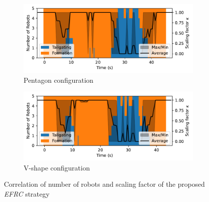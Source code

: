 \begin{figure}[!h]
\begin{subfigure}[b]{0.49\textwidth}
    
    \centering
    \includegraphics[width=\linewidth]{paper2/images/mode_edc_shape1.pdf}
    \caption{Pentagon configuration}
    \label{fig:1mode_edc1}
\end{subfigure}
\begin{subfigure}[b]{0.49\textwidth}
    \centering
    \includegraphics[width=\linewidth]{paper2/images/mode_edc_shape2.pdf}
    \caption{V-shape configuration}
    \label{fig:1mode_edc2}
\end{subfigure}
\caption{Correlation of number of robots and scaling factor of the proposed \textit{EFRC} strategy}
\label{fig:1mode}
\end{figure}

